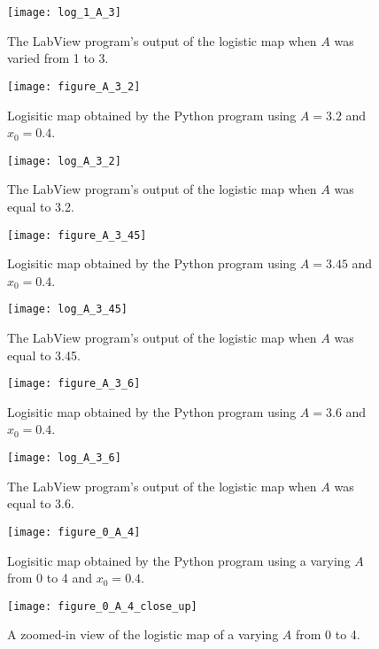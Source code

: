 \documentclass[12pt]{report}
\theoremstyle{definition}
\begin{document}
\begin{figure}[!htb]
\centering
\texttt{[image: log\_1\_A\_3]}
\caption{The LabView program's output of the logistic map when $A$ was varied from 1 to 3. \label{log13}}
\end{figure}

\begin{figure}[!htb]
\centering
\texttt{[image: figure\_A\_3\_2]}
\caption{Logisitic map obtained by the Python program using $A=3.2$ and $x_0=0.4$. \label{fig:A_3_2}}
\end{figure}

\begin{figure}[!htb]
\centering
\texttt{[image: log\_A\_3\_2]}
\caption{The LabView program's output of the logistic map when $A$ was equal to 3.2. \label{log3.2}}
\end{figure}

\begin{figure}[!htb]
\centering
\texttt{[image: figure\_A\_3\_45]}
\caption{Logisitic map obtained by the Python program using $A=3.45$ and $x_0=0.4$. \label{fig:A_3_45}}
\end{figure}

\begin{figure}[!htb]
\centering
\texttt{[image: log\_A\_3\_45]}
\caption{The LabView program's output of the logistic map when $A$ was equal to 3.45. \label{log3.45}}
\end{figure}

\begin{figure}[!htb]
\centering
\texttt{[image: figure\_A\_3\_6]}
\caption{Logisitic map obtained by the Python program using $A=3.6$ and $x_0=0.4$. \label{fig:A_3_6}}
\end{figure}

\begin{figure}[!htb]
\centering
\texttt{[image: log\_A\_3\_6]}
\caption{The LabView program's output of the logistic map when $A$ was equal to 3.6. \label{log3.6}}
\end{figure}

\begin{figure}[!htb]
\centering
\texttt{[image: figure\_0\_A\_4]}
\caption{Logisitic map obtained by the Python program using a varying $A$ from 0 to 4 and $x_0=0.4$. \label{fig:0_A_4}}
\end{figure}

\begin{figure}[!htb]
\centering
\texttt{[image: figure\_0\_A\_4\_close\_up]}
\caption{A zoomed-in view of the logistic map of a varying $A$ from 0 to 4. \label{fig:0_A_4_close_up}}
\end{figure}
\end{document}
